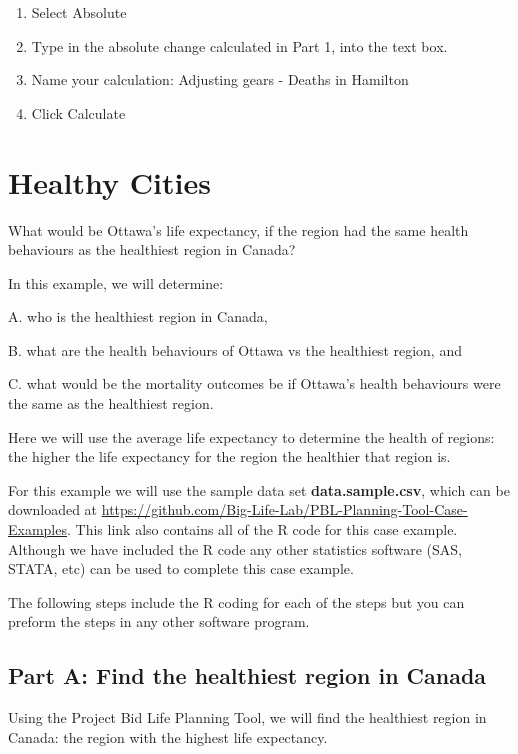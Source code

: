 \documentclass[]{book}
\begin{document}
\begin{enumerate}
\def\labelenumi{\arabic{enumi}.}
\setcounter{enumi}{5}
\item
  Select Absolute
\item
  Type in the absolute change calculated in Part 1, into the text box.
\item
  Name your calculation: Adjusting gears - Deaths in Hamilton
\item
  Click Calculate
\end{enumerate}

\section{Healthy Cities}\label{healthy-cities}

What would be Ottawa's life expectancy, if the region had the same
health behaviours as the healthiest region in Canada?

In this example, we will determine:

A. who is the healthiest region in Canada,

B. what are the health behaviours of Ottawa vs the healthiest region,
and

C. what would be the mortality outcomes be if Ottawa's health behaviours
were the same as the healthiest region.

Here we will use the average life expectancy to determine the health of
regions: the higher the life expectancy for the region the healthier
that region is.

For this example we will use the sample data set
\textbf{data.sample.csv}, which can be downloaded at
\url{https://github.com/Big-Life-Lab/PBL-Planning-Tool-Case-Examples}.
This link also contains all of the R code for this case example.
Although we have included the R code any other statistics software (SAS,
STATA, etc) can be used to complete this case example.

The following steps include the R coding for each of the steps but you
can preform the steps in any other software program.

\subsection{Part A: Find the healthiest region in
Canada}\label{part-a-find-the-healthiest-region-in-canada}

Using the Project Bid Life Planning Tool, we will find the healthiest
region in Canada: the region with the highest life expectancy.
\end{document}
